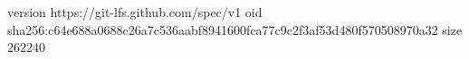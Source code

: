 version https://git-lfs.github.com/spec/v1
oid sha256:c64e688a0688c26a7c536aabf8941600fca77c9c2f3af53d480f570508970a32
size 262240
